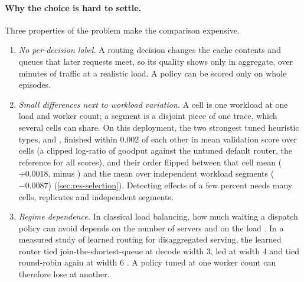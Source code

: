 \paragraph{Why the choice is hard to settle.}
Three properties of the problem make the comparison expensive.
\begin{enumerate}
  \item \emph{No per-decision label.} A routing decision changes the cache contents and queues
    that later requests meet, so its quality shows only in aggregate, over minutes of traffic at a
    realistic load. A policy can be scored only on whole episodes.
  \item \emph{Small differences next to workload variation.} A cell is one workload at one load and
    worker count; a segment is a disjoint piece of one trace, which several cells can share. On this
    deployment, the two strongest tuned heuristic types,  and
    , finished within 0.002 of each other in mean validation score over
    cells (a clipped log-ratio of goodput against the untuned default router, the reference for all
    scores), and their order flipped between that cell mean ($+0.0018$,  minus
    ) and the mean over independent workload segments ($-0.0087$)
    (\cref{sec:res-selection}). Detecting effects of a few percent needs many cells, replicates and
    independent segments.
  \item \emph{Regime dependence.} In classical load balancing, how much waiting a dispatch
    policy can avoid depends on the number of servers and on the load
    \citep{vanderboor2022survey}. In a measured study of learned routing for disaggregated
    serving, the learned router tied join-the-shortest-queue at decode width 3, led at width 4
    and tied round-robin again at width 6 \citep{tumkur2026calibrate}. A policy tuned at
    one worker count can therefore lose at another.
\end{enumerate}
